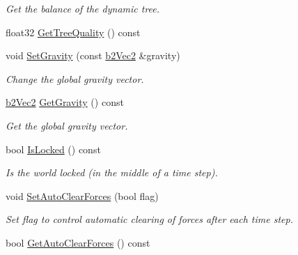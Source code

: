 \begin{DoxyCompactItemize}
\begin{DoxyCompactList}\small\item\em Get the balance of the dynamic tree. \end{DoxyCompactList}\item 
float32 \hyperlink{classb2_world_a0e9dceab7052fd6e0d73d6024cca1bcb}{Get\+Tree\+Quality} () const 
\item 
void \hyperlink{classb2_world_aeafa43d6580e1dddb0675e672ca2375c}{Set\+Gravity} (const \hyperlink{structb2_vec2}{b2\+Vec2} \&gravity)\hypertarget{classb2_world_aeafa43d6580e1dddb0675e672ca2375c}{}\label{classb2_world_aeafa43d6580e1dddb0675e672ca2375c}

\begin{DoxyCompactList}\small\item\em Change the global gravity vector. \end{DoxyCompactList}\item 
\hyperlink{structb2_vec2}{b2\+Vec2} \hyperlink{classb2_world_a1e34bcd2f75fbdd41e2d84b3eb26d1ab}{Get\+Gravity} () const \hypertarget{classb2_world_a1e34bcd2f75fbdd41e2d84b3eb26d1ab}{}\label{classb2_world_a1e34bcd2f75fbdd41e2d84b3eb26d1ab}

\begin{DoxyCompactList}\small\item\em Get the global gravity vector. \end{DoxyCompactList}\item 
bool \hyperlink{classb2_world_ae50c318304546c9cc066ee382668c4a1}{Is\+Locked} () const \hypertarget{classb2_world_ae50c318304546c9cc066ee382668c4a1}{}\label{classb2_world_ae50c318304546c9cc066ee382668c4a1}

\begin{DoxyCompactList}\small\item\em Is the world locked (in the middle of a time step). \end{DoxyCompactList}\item 
void \hyperlink{classb2_world_aa2bced28ddef5bbb00ed5666e5e9f620}{Set\+Auto\+Clear\+Forces} (bool flag)\hypertarget{classb2_world_aa2bced28ddef5bbb00ed5666e5e9f620}{}\label{classb2_world_aa2bced28ddef5bbb00ed5666e5e9f620}

\begin{DoxyCompactList}\small\item\em Set flag to control automatic clearing of forces after each time step. \end{DoxyCompactList}\item 
bool \hyperlink{classb2_world_af56cc43ebde27946ed39382b4ea31640}{Get\+Auto\+Clear\+Forces} () const \hypertarget{classb2_world_af56cc43ebde27946ed39382b4ea31640}{}\label{classb2_world_af56cc43ebde27946ed39382b4ea31640}


\end{DoxyCompactItemize}
